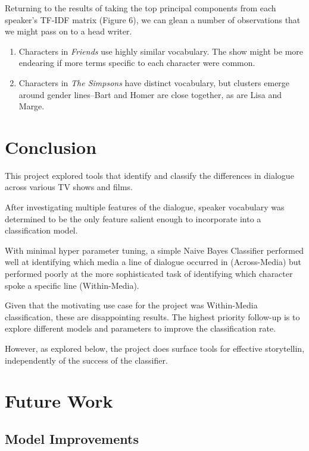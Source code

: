 \documentclass{article}
\begin{document}
\begin{titlepage}
Returning to the results of taking the top principal components from each speaker's TF-IDF matrix (Figure 6), we can glean a number of observations that we might pass on to a head writer.

\begin{enumerate}
\item Characters in \textit{Friends} use highly similar vocabulary. The show might be more endearing if more terms specific to each character were common.
\item Characters in \textit{The Simpsons} have distinct vocabulary, but clusters emerge around gender lines–Bart and Homer are close together, as are Lisa and Marge. 
\end{enumerate}


\section{Conclusion}
This project explored tools that identify and classify the differences in dialogue across various TV shows and films.

After investigating multiple features of the dialogue, speaker vocabulary was determined to be the only feature salient enough to incorporate into a classification model.

With minimal hyper parameter tuning, a simple Naive Bayes Classifier performed well at identifying which media a line of dialogue occurred in (Across-Media) but performed poorly at the more sophisticated task of identifying which character spoke a specific line (Within-Media).

Given that the motivating use case for the project was Within-Media classification, these are disappointing results. The highest priority follow-up is to explore different models and parameters to improve the classification rate.

However, as explored below, the project does surface tools for effective storytellin, independently of the success of the classifier.

\section{Future Work}
\subsection{Model Improvements}


\end{titlepage}
\end{document}
